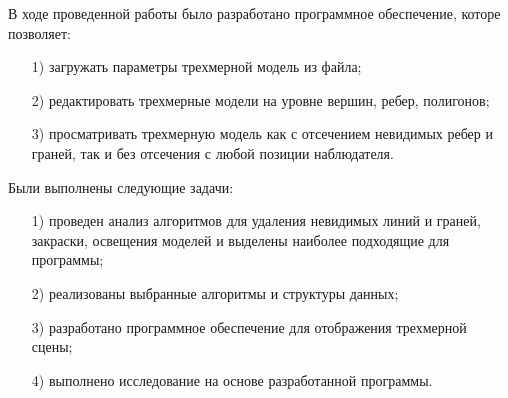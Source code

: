 
В ходе проведенной работы было разработано программное обеспечение, которе позволяет: 
\begin{enumerate}
	\item[1)] загружать параметры трехмерной модель из файла;
	\item[2)] редактировать трехмерные модели на уровне вершин, ребер, полигонов; 
	\item[3)] просматривать трехмерную модель как с отсечением невидимых ребер и граней, так и без отсечения с любой позиции наблюдателя.
\end{enumerate}

Были выполнены следующие задачи:
\begin{enumerate}
	\item[1)] проведен анализ алгоритмов для удаления невидимых линий и граней, закраски, освещения моделей и выделены наиболее подходящие для программы;
	\item[2)] реализованы выбранные алгоритмы и структуры данных;
	\item[3)] разработано программное обеспечение для отображения трехмерной
	сцены;
	\item[4)] выполнено исследование на основе разработанной программы.
\end{enumerate}